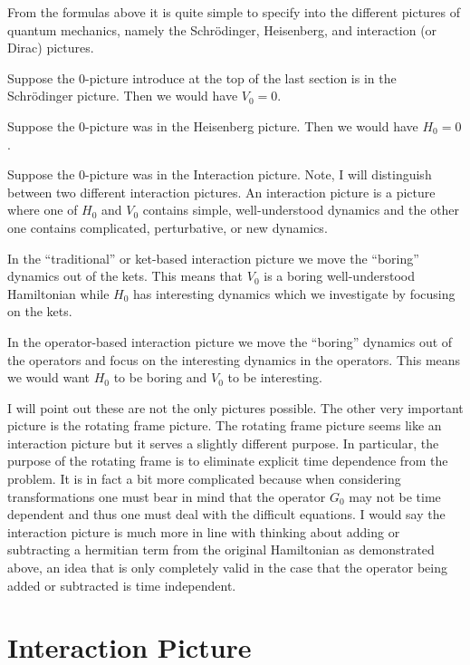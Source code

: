 \documentclass[12pt]{article}
\begin{document}
From the formulas above it is quite simple to specify into the different pictures of quantum mechanics, namely the Schr{\"o}dinger, Heisenberg, and interaction (or Dirac) pictures.

Suppose the $0$-picture introduce at the top of the last section is in the Schr{\"o}dinger picture. Then we would have $V_0=0$. 

Suppose the $0$-picture was in the Heisenberg picture. Then we would have $H_0=0$.

Suppose the $0$-picture was in the Interaction picture. Note, I will distinguish between two different interaction pictures. An interaction picture is a picture where one of $H_0$ and $V_0$ contains simple, well-understood dynamics and the other one contains complicated, perturbative, or new dynamics. 

In the ``traditional'' or ket-based interaction picture we move the ``boring'' dynamics out of the kets. This means that $V_0$ is a boring well-understood Hamiltonian while $H_0$ has interesting dynamics which we investigate by focusing on the kets.

In the operator-based interaction picture we move the ``boring'' dynamics out of the operators and focus on the interesting dynamics in the operators. This means we would want $H_0$ to be boring and $V_0$ to be interesting.

I will point out these are not the only pictures possible. The other very important picture is the rotating frame picture. The rotating frame picture seems like an interaction picture but it serves a slightly different purpose. In particular, the purpose of the rotating frame is to eliminate explicit time dependence from the problem. It is in fact a bit more complicated because when considering transformations one must bear in mind that the operator $G_0$ may not be time dependent and thus one must deal with the difficult equations. I would say the interaction picture is much more in line with thinking about adding or subtracting a hermitian term from the original Hamiltonian as demonstrated above, an idea that is only completely valid in the case that the operator being added or subtracted is time independent.



\section{Interaction Picture}
\end{document}
